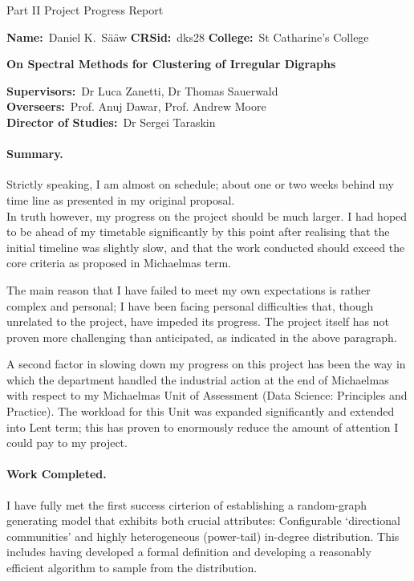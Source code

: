 \documentclass[10pt, twoside, a4paper]{article}
\begin{document}
{\noindent \Large Part II Project Progress Report}
\vspace{0.6cm}

{\noindent \textbf{Name:}\ Daniel K.\ S\"a\"aw
 \quad     \textbf{CRSid:}\ dks28
 \quad     \textbf{College:}\ St Catharine's College
\vspace{1.0cm}

{\noindent \Large\bfseries On Spectral Methods for Clustering of Irregular Digraphs}
\vspace{0.6cm}

 \noindent \textbf{Supervisors:}\ Dr Luca Zanetti, Dr Thomas Sauerwald\\
	   \textbf{Overseers:}\ Prof. Anuj Dawar, Prof. Andrew Moore\\
	   \textbf{Director of Studies:}\ Dr Sergei Taraskin
}

\paragraph{Summary.}
Strictly speaking, I am almost on schedule; about one or two weeks behind my time line as presented in my original proposal. \\
In truth however, my progress on the project should be much larger. I had hoped to be ahead of my timetable significantly by this point after realising that the initial timeline was slightly slow, and that the work conducted should exceed the core criteria as proposed in Michaelmas term.  

The main reason that I have failed to meet my own expectations is rather complex and personal; I have been facing personal difficulties that, though unrelated to the project, have impeded its progress. The project itself has not proven more challenging than anticipated, as indicated in the above paragraph. 

A second factor in slowing down my progress on this project has been the way in which the department handled the industrial action at the end of Michaelmas with respect to my Michaelmas Unit of Assessment (Data Science: Principles and Practice). The workload for this Unit was expanded significantly and extended into Lent term; this has proven to enormously reduce the amount of attention I could pay to my project. 

\paragraph{Work Completed.}
I have fully met the first success cirterion of establishing a random-graph generating model that exhibits both crucial attributes: Configurable `directional communities' and highly heterogeneous (power-tail) in-degree distribution. This includes having developed a formal definition and developing a reasonably efficient algorithm to sample from the distribution. 
\end{document}
